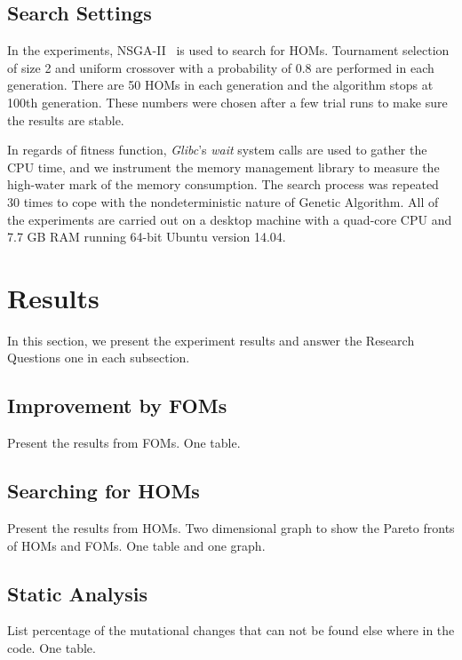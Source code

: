 \documentclass[oribibl]{llncs}
\begin{document}
\subsection{Search Settings}
\label{sec_searchsetting}

In the experiments, NSGA-II~\cite{996017} is used to search for HOMs.
Tournament selection of size 2 and uniform crossover with a probability of 0.8 are performed in each generation.
There are 50 HOMs in each generation and the algorithm stops at 100th generation.
These numbers were chosen after a few trial runs to make sure the results are stable.

In regards of fitness function, \emph{Glibc}'s \emph{wait} system calls are used to gather the CPU time, and we instrument the memory management library to measure the high-water mark of the memory consumption.
The search process was repeated 30 times to cope with the nondeterministic nature of Genetic Algorithm.
All of the experiments are carried out on a desktop machine with a quad-core CPU and 7.7 GB RAM running 64-bit Ubuntu version 14.04.

\section{Results}
\label{sec_result}

In this section, we present the experiment results and answer the Research Questions one in each subsection.

\subsection{Improvement by FOMs}
\label{sec_resfom}

Present the results from FOMs. One table.

\subsection{Searching for HOMs}
\label{sec_reshom}

Present the results from HOMs. Two dimensional graph to show the Pareto fronts of HOMs and FOMs. One table and one graph.

\subsection{Static Analysis}
\label{sec_resstatic}

List percentage of the mutational changes that can not be found else where in the code. One table.
\end{document}
